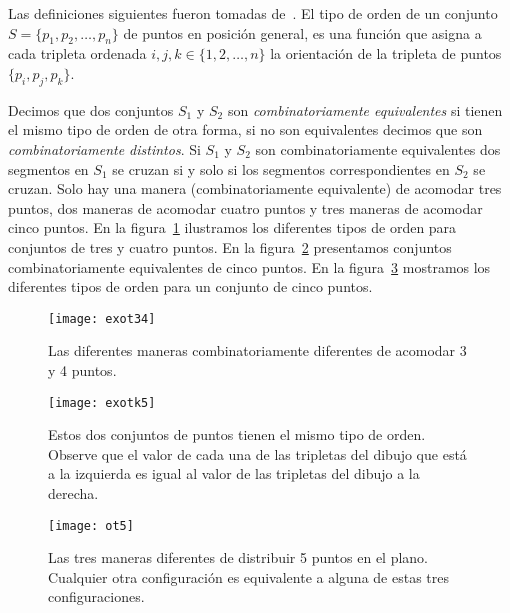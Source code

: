 Las definiciones siguientes fueron tomadas de~\cite{Aichholzer2002}.
El tipo de orden de un conjunto $S=\{p_1,p_2,\dots,p_n\}$ de puntos en posición
general, es una función que asigna a cada tripleta ordenada
$i,j,k \in \{1,2,\dots,n\}$ la orientación de la tripleta de puntos
$\{p_i,p_j,p_k\}$.

Decimos que dos conjuntos $S_1$ y $S_2$ son \emph{combinatoriamente
equivalentes} si tienen el mismo tipo de orden de otra forma, si no son
equivalentes decimos que son \emph{combinatoriamente distintos}. Si $S_1$ y
$S_2$ son combinatoriamente equivalentes dos segmentos en $S_1$ se cruzan si y
solo si los segmentos correspondientes en $S_2$ se cruzan. Solo hay una manera
(combinatoriamente equivalente) de acomodar tres puntos,
dos maneras de acomodar cuatro puntos y tres maneras de acomodar cinco puntos.
En la figura~\ref{fig:exotk34} ilustramos los diferentes tipos de orden
para conjuntos de tres y cuatro puntos. En la figura~\ref{fig:exotk5}
presentamos conjuntos combinatoriamente equivalentes de cinco puntos. En la
figura~\ref{fig:ot5} mostramos los diferentes tipos de orden para un conjunto
de cinco puntos.

\begin{figure}[htpb]
  \centering
  \texttt{[image: exot34]}
  \caption{Las diferentes maneras combinatoriamente diferentes
  de acomodar 3 y 4 puntos.}
  \label{fig:exotk34}
\end{figure}
\begin{figure}[htpb]
  \centering
  \texttt{[image: exotk5]}
  \caption{Estos dos conjuntos de puntos tienen el mismo tipo de orden.
  Observe que el valor de cada una de las tripletas del dibujo
  que está a la izquierda es igual al valor de las tripletas del
  dibujo a la derecha.}
  \label{fig:exotk5}
\end{figure}
\begin{figure}[htpb]
  \centering
  \texttt{[image: ot5]}
  \caption{Las tres maneras diferentes de distribuir 5 puntos en el plano.
  Cualquier otra configuración es equivalente a alguna de estas tres
  configuraciones.}
  \label{fig:ot5}
\end{figure}

